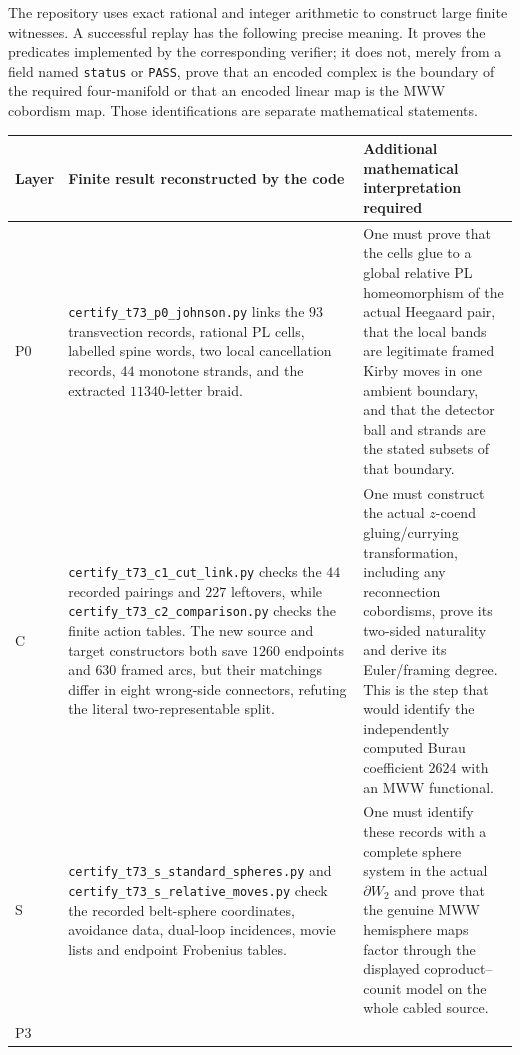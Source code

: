 \documentclass[11pt]{amsart}
\theoremstyle{definition}
\theoremstyle{remark}
\begin{document}
The repository uses exact rational and integer arithmetic to construct large
finite witnesses.  A successful replay has the following precise meaning.
It proves the predicates implemented by the corresponding verifier; it does
not, merely from a field named \texttt{status} or \texttt{PASS}, prove that an
encoded complex is the boundary of the required four-manifold or that an
encoded linear map is the MWW cobordism map.  Those identifications are
separate mathematical statements.

\begin{center}
\small
\begin{tabularx}{\textwidth}{@{}l X X@{}}
\toprule
Layer & Finite result reconstructed by the code & Additional mathematical interpretation required \\
\midrule
P0 &
\texttt{certify\_t73\_p0\_johnson.py} links the $93$ transvection records,
rational PL cells, labelled spine words, two local cancellation records,
$44$ monotone strands, and the extracted $11340$-letter braid. &
One must prove that the cells glue to a global relative PL homeomorphism of
the actual Heegaard pair, that the local bands are legitimate framed Kirby
moves in one ambient boundary, and that the detector ball and strands are the
stated subsets of that boundary. \\
\addlinespace
C &
\texttt{certify\_t73\_c1\_cut\_link.py} checks the $44$ recorded pairings and
$227$ leftovers, while \texttt{certify\_t73\_c2\_comparison.py} checks the
finite action tables.  The new source and target constructors both save
$1260$ endpoints and $630$ framed arcs, but their matchings differ in eight
wrong-side connectors, refuting the literal two-representable split. &
One must construct the actual $z$-coend gluing/currying transformation,
including any reconnection cobordisms, prove its two-sided naturality and
derive its Euler/framing degree.  This is the step that would identify the
independently computed Burau coefficient $2624$ with an MWW functional. \\
\addlinespace
S &
\texttt{certify\_t73\_s\_standard\_spheres.py} and
\texttt{certify\_t73\_s\_relative\_moves.py} check the recorded belt-sphere
coordinates, avoidance data, dual-loop incidences, movie lists and endpoint
Frobenius tables. &
One must identify these records with a complete sphere system in the actual
$\partial W_2$ and prove that the genuine MWW hemisphere maps factor through
the displayed coproduct--counit model on the whole cabled source. \\
\addlinespace
P3 &

\end{tabularx}
\end{center}
\end{document}
